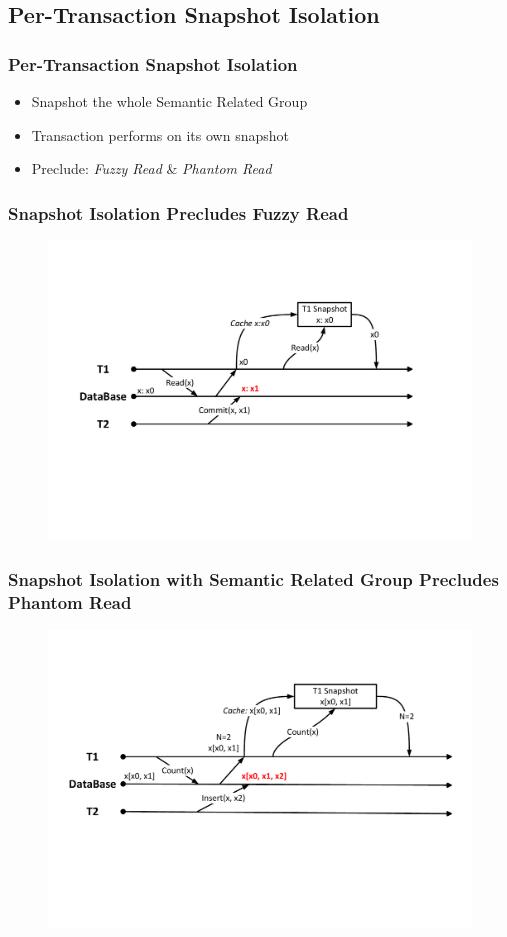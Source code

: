 \documentclass{beamer}
\begin{document}
\subsection{Per-Transaction Snapshot Isolation}
\begin{frame}
	\frametitle{Per-Transaction Snapshot Isolation}
	\begin{itemize}
		\item Snapshot the whole Semantic Related Group
		\item Transaction performs on its own snapshot
		\item Preclude: \textit{Fuzzy Read} \& \textit{Phantom Read}
	\end{itemize}
\end{frame}
\begin{frame}
	\frametitle{Snapshot Isolation Precludes Fuzzy Read}
	\begin{figure}[!h]
		\centering
		\includegraphics[width=\linewidth]{figs/snapfuzzy.pdf}
	\end{figure}
\end{frame}
\begin{frame}
	\frametitle{Snapshot Isolation with Semantic Related Group Precludes Phantom Read}
\begin{figure}[!h]
	\centering
	\includegraphics[width=\linewidth]{figs/snapphantom.pdf}
\end{figure}
\end{frame}
\end{document}
